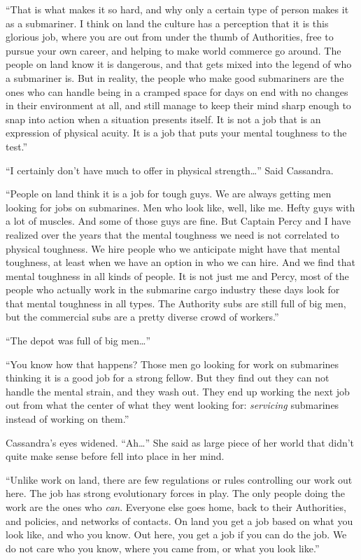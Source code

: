\documentclass[
]{scrbook}
\begin{document}
``That is what makes it so hard, and why only a certain type of person
makes it as a submariner. I think on land the culture has a perception
that it is this glorious job, where you are out from under the thumb of
Authorities, free to pursue your own career, and helping to make world
commerce go around. The people on land know it is dangerous, and that
gets mixed into the legend of who a submariner is. But in reality, the
people who make good submariners are the ones who can handle being in a
cramped space for days on end with no changes in their environment at
all, and still manage to keep their mind sharp enough to snap into
action when a situation presents itself. It is not a job that is an
expression of physical acuity. It is a job that puts your mental
toughness to the test.''

``I certainly don't have much to offer in physical strength\ldots{}''
Said Cassandra.

``People on land think it is a job for tough guys. We are always getting
men looking for jobs on submarines. Men who look like, well, like me.
Hefty guys with a lot of muscles. And some of those guys are fine. But
Captain Percy and I have realized over the years that the mental
toughness we need is not correlated to physical toughness. We hire
people who we anticipate might have that mental toughness, at least when
we have an option in who we can hire. And we find that mental toughness
in all kinds of people. It is not just me and Percy, most of the people
who actually work in the submarine cargo industry these days look for
that mental toughness in all types. The Authority subs are still full of
big men, but the commercial subs are a pretty diverse crowd of
workers.''

``The depot was full of big men\ldots{}''

``You know how that happens? Those men go looking for work on submarines
thinking it is a good job for a strong fellow. But they find out they
can not handle the mental strain, and they wash out. They end up working
the next job out from what the center of what they went looking for:
\emph{servicing} submarines instead of working on them.''

Cassandra's eyes widened. ``Ah\ldots{}'' She said as large piece of her
world that didn't quite make sense before fell into place in her mind.

``Unlike work on land, there are few regulations or rules controlling
our work out here. The job has strong evolutionary forces in play. The
only people doing the work are the ones who \emph{can}. Everyone else
goes home, back to their Authorities, and policies, and networks of
contacts. On land you get a job based on what you look like, and who you
know. Out here, you get a job if you can do the job. We do not care who
you know, where you came from, or what you look like.''
\end{document}
